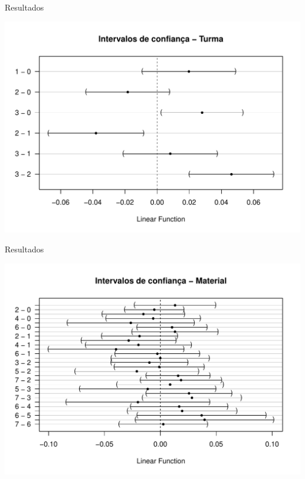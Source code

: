 \documentclass[
  ignorenonframetext,
]{beamer}
\begin{document}
\begin{frame}{Resultados}
\protect\hypertarget{resultados-2}{}

\begin{center}\includegraphics{apresentacao_final_files/figure-beamer/effects_mpc_o2_turma-1} \end{center}

\end{frame}

\begin{frame}{Resultados}
\protect\hypertarget{resultados-3}{}

\begin{center}\includegraphics{apresentacao_final_files/figure-beamer/effects_mpc_o2_material-1} \end{center}

\end{frame}
\end{document}
